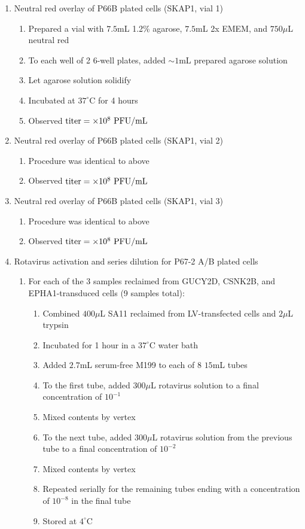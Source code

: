\begin{enumerate}
	\item Neutral red overlay of P66B plated cells (SKAP1, vial 1)
		\begin{enumerate}
			\item Prepared a vial with $7.5$mL 1.2\% agarose, $7.5$mL 2x EMEM, and $750\mu$L neutral red
			\item To each well of 2 6-well plates, added $\sim 1$mL prepared agarose solution
			\item Let agarose solution solidify
			\item Incubated at $37^{\circ}$C for 4 hours
			\item Observed $\text{titer}=\times 10^{8}\text{ PFU/mL}$
		\end{enumerate}
	\item Neutral red overlay of P66B plated cells (SKAP1, vial 2)
		\begin{enumerate}
			\item Procedure was identical to above
			\item Observed $\text{titer}=\times 10^{8}\text{ PFU/mL}$
		\end{enumerate}
	\item Neutral red overlay of P66B plated cells (SKAP1, vial 3)
		\begin{enumerate}
			\item Procedure was identical to above
			\item Observed $\text{titer}=\times 10^{8}\text{ PFU/mL}$
		\end{enumerate}
	\item Rotavirus activation and series dilution for P67-2 A/B plated cells
		\begin{enumerate}
			\item For each of the 3 samples reclaimed from GUCY2D, CSNK2B, and EPHA1-transduced cells (9 samples total):
				\begin{enumerate}
					\item Combined $400\mu$L SA11 reclaimed from LV-transfected cells and $2\mu$L trypsin
					\item Incubated for 1 hour in a $37^{\circ}$C water bath
					\item Added $2.7$mL serum-free M199 to each of 8 $15$mL tubes
					\item To the first tube, added $300\mu$L rotavirus solution to a final concentration of $10^{-1}$
					\item Mixed contents by vertex
					\item To the next tube, added $300\mu$L rotavirus solution from the previous tube to a final concentration of $10^{-2}$
					\item Mixed contents by vertex
					\item Repeated serially for the remaining tubes ending with a concentration of $10^{-8}$ in the final tube
					\item Stored at $4^{\circ}$C
				\end{enumerate}
		\end{enumerate}
\end{enumerate}

